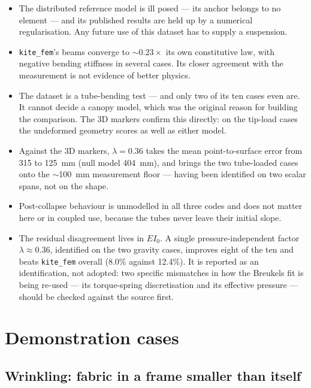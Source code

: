 \documentclass[11pt,a4paper]{article}
\begin{document}
\begin{itemize}
\item The distributed reference model is ill posed --- its anchor belongs to no
      element --- and its published results are held up by a numerical
      regularisation. Any future use of this dataset has to supply a suspension.
\item \texttt{kite\_fem}'s beams converge to $\sim0.23\times$ its own
      constitutive law, with negative bending stiffness in several cases. Its
      closer agreement with the measurement is not evidence of better physics.
\item The dataset is a tube-bending test --- and only two of its ten cases even
      are. It cannot decide a canopy model, which was the original reason for
      building the comparison. The 3D markers confirm this directly: on the
      tip-load cases the undeformed geometry scores as well as either model.
\item Against the 3D markers, $\lambda = 0.36$ takes the mean point-to-surface
      error from \SI{315}{} to \SI{125}{mm} (null model \SI{404}{mm}), and
      brings the two tube-loaded cases onto the $\sim$\SI{100}{mm} measurement
      floor --- having been identified on two scalar spans, not on the shape.
\item Post-collapse behaviour is unmodelled in all three codes and does not
      matter here or in coupled use, because the tubes never leave their initial
      slope.
\item The residual disagreement lives in $EI_0$. A single pressure-independent
      factor $\lambda \approx 0.36$, identified on the two gravity cases,
      improves eight of the ten and beats \texttt{kite\_fem} overall
      (8.0\% against 12.4\%). It is reported as an identification, not
      adopted: two specific mismatches in how the Breukels fit is being
      re-used --- its torque-spring discretisation and its effective
      pressure --- should be checked against the source first.
\end{itemize}


\section{Demonstration cases}

\subsection{Wrinkling: fabric in a frame smaller than itself}
\end{document}
